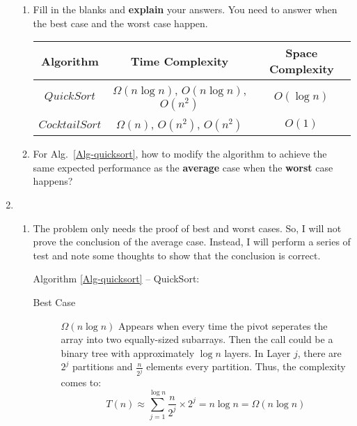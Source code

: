 \documentclass[12pt,a4paper]{article}
\makeatletter
\newtheorem*{solution}{Solution}
\theoremstyle{definition}
\renewenvironment{solution}[1][Solution] {\par\pushQED{\qed}\normalfont\topsep6\p@\@plus6\p@\relax\trivlist\item[\hskip\labelsep\bfseries#1\@addpunct{.}]\ignorespaces}{\popQED\endtrivlist\@endpefalse} \makeatother
\makeatother
\begin{document}
\begin{enumerate}
\begin{minipage}[t]{0.45\textwidth}
\begin{algorithm}[H]
		$i\leftarrow i+1$\;
	}
\end{algorithm}
\end{minipage}

\begin{enumerate}
	 
\item Fill in the blanks and \textbf{explain} your answers. You need to answer when the best case and the worst case happen. 
\begin{table}[!h]

\label{Tab-compare}
	\centering
	\begin{threeparttable}
	\begin{tabular}{c|c| c }
		\toprule[2pt]
		\textbf{Algorithm} & \textbf{Time Complexity}\tnote{1} & \textbf{Space Complexity} \\
		\hline
		\hline
		$QuickSort$ & $\Omega(n\log n)$, $O(n \log n)$, $O(n^2)$ & $O(\log n)$ \\

		$CocktailSort$ & $\Omega(n)$, $O(n^2)$, $O(n^2)$ & $O(1)$  \\
		\bottomrule[2pt]


	\end{tabular}
	\end{threeparttable}
\end{table}

\item For Alg.~\ref{Alg-quicksort}, how to modify the algorithm to achieve the same expected performance as the \textbf{average} case when the \textbf{worst} case happens?
\end{enumerate} 
\begin{solution}
	\begin{enumerate}
		\item The problem only needs the proof of best and worst cases. So, I will not prove the conclusion of the average case. Instead, I will perform a series of test and note some thoughts to show that the conclusion is correct.
		
		Algorithm \ref{Alg-quicksort} -- QuickSort:
		\begin{description}
			\item[Best Case] $\Omega(n\log n)$ Appears when every time the pivot seperates the array into two equally-sized subarrays. Then the call could be a binary tree with approximately $\log n$ layers. In Layer $j$, there are $2^j$ partitions and $\frac{n}{2^j}$ elements every partition. Thus, the complexity comes to:
			\begin{equation*}
				T(n) \approx \sum_{j=1}^{\log n}\frac{n}{2^j}\times 2^j = n\log n = \Omega(n\log n)
			\end{equation*}
			

\end{description}
\end{enumerate}
\end{solution}
\end{enumerate}
\end{document}
